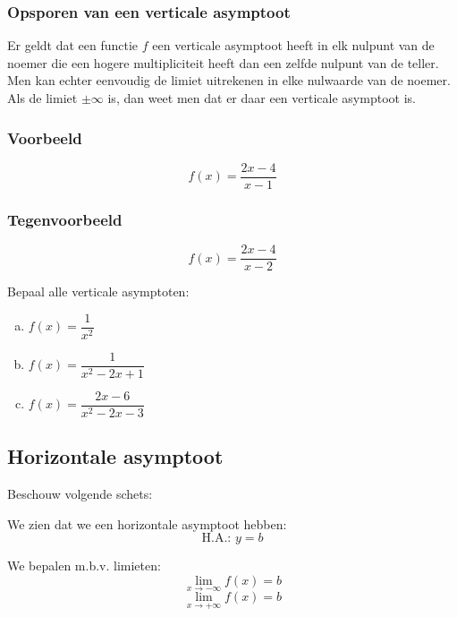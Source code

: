 \documentclass[12pt,twoside,a4paper]{article}
\begin{document}
\subsubsection*{Opsporen van een verticale asymptoot}

Er geldt dat een functie $f$ een verticale asymptoot heeft in elk nulpunt van de noemer die een hogere multipliciteit heeft dan een zelfde nulpunt van de teller. Men kan echter eenvoudig de limiet uitrekenen in elke nulwaarde van de noemer. Als de limiet $\pm \infty$ is, dan weet men dat er daar een verticale asymptoot is.

\subsubsection*{Voorbeeld}
$$f(x)=\dfrac{2x-4}{x-1}$$

\subsubsection*{Tegenvoorbeeld}
$$f(x)=\dfrac{2x-4}{x-2}$$

\begin{oefening}
Bepaal alle verticale asymptoten:
\begin{enumerate}[(a)]
  \itemsep.5em
  \item $f(x)=\dfrac{1}{x^2}$
  \item $f(x)=\dfrac{1}{x^2-2x+1}$
  \item $f(x)=\dfrac{2x-6}{x^2-2x-3}$
\end{enumerate}
\end{oefening}

\subsection{Horizontale asymptoot}

\begin{minipage}{0.5\textwidth}
Beschouw volgende schets:
\begin{center}
\end{center}
\end{minipage}
\begin{minipage}{0.5\textwidth}
We zien dat we een horizontale asymptoot hebben:
$$\mbox{H.A.: }y=b$$

We bepalen m.b.v. limieten:
$$\lim_{x\to -\infty} f(x)=b$$
$$\lim_{x\to +\infty} f(x)=b$$
\vfill
\end{minipage}
\end{document}
